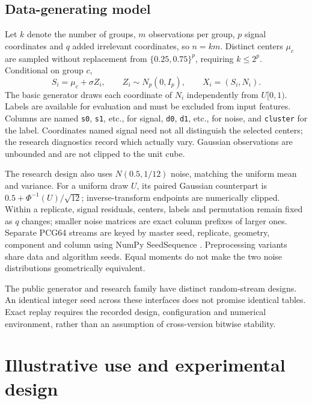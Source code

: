 \documentclass[preprint,12pt]{elsarticle}
\begin{document}
\subsection{Data-generating model}
Let $k$ denote the number of groups, $m$ observations per group, $p$ signal
coordinates and $q$ added irrelevant coordinates, so $n=km$. Distinct centers
$\mu_c$ are sampled without replacement from $\{0.25,0.75\}^{p}$, requiring
$k\leq 2^p$. Conditional on group $c$,
\begin{equation}
 S_i=\mu_c+\sigma Z_i,\qquad Z_i\sim N_p(0,I_p),\qquad
 X_i=(S_i,N_i).
\end{equation}
The basic generator draws each coordinate of $N_i$ independently from
$U[0,1)$. Labels are available for evaluation and must be excluded from input
features. Columns are named \texttt{s0}, \texttt{s1}, etc., for signal,
\texttt{d0}, \texttt{d1}, etc., for noise, and \texttt{cluster} for the label.
Coordinates named signal need not all distinguish the selected centers; the
research diagnostics record which actually vary. Gaussian observations are
unbounded and are not clipped to the unit cube.

The research design also uses $N(0.5,1/12)$ noise, matching the uniform mean
and variance. For a uniform draw $U$, its paired Gaussian counterpart is
$0.5+\Phi^{-1}(U)/\sqrt{12}$; inverse-transform endpoints are numerically
clipped. Within a replicate, signal residuals, centers, labels and permutation
remain fixed as $q$ changes; smaller noise matrices are exact column prefixes
of larger ones. Separate PCG64 streams are keyed by master seed, replicate,
geometry, component and column using NumPy SeedSequence \cite{numpyparallel}.
Preprocessing variants share data and algorithm seeds. Equal moments do not
make the two noise distributions geometrically equivalent.

The public generator and research family have distinct random-stream designs.
An identical integer seed across these interfaces does not promise identical
tables. Exact replay requires the recorded design, configuration and numerical
environment, rather than an assumption of cross-version bitwise stability.

\section{Illustrative use and experimental design}
\end{document}
